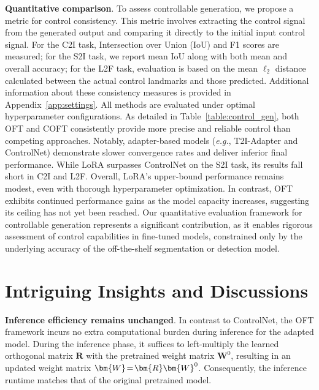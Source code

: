 \textbf{Quantitative comparison}. To assess controllable generation, we propose a metric for control consistency. This metric involves extracting the control signal from the generated output and comparing it directly to the initial input control signal. For the C2I task, Intersection over Union (IoU) and F1 scores are measured; for the S2I task, we report mean IoU along with both mean and overall accuracy; for the L2F task, evaluation is based on the mean $\ell_2$ distance calculated between the actual control landmarks and those predicted. Additional information about these consistency measures is provided in Appendix~\ref{app:settings}. All methods are evaluated under optimal hyperparameter configurations. As detailed in Table~\ref{table:control_gen}, both OFT and COFT consistently provide more precise and reliable control than competing approaches. Notably, adapter-based models (\emph{e.g.}, T2I-Adapter and ControlNet) demonstrate slower convergence rates and deliver inferior final performance. While LoRA surpasses ControlNet on the S2I task, its results fall short in C2I and L2F. Overall, LoRA’s upper-bound performance remains modest, even with thorough hyperparameter optimization. In contrast, OFT exhibits continued performance gains as the model capacity increases, suggesting its ceiling has not yet been reached. Our quantitative evaluation framework for controllable generation represents a significant contribution, as it enables rigorous assessment of control capabilities in fine-tuned models, constrained only by the underlying accuracy of the off-the-shelf segmentation or detection model.

\section{Intriguing Insights and Discussions}

\textbf{Inference efficiency remains unchanged}. In contrast to ControlNet, the OFT framework incurs no extra computational burden during inference for the adapted model. During the inference phase, it suffices to left-multiply the learned orthogonal matrix $\bm{R}$ with the pretrained weight matrix $\bm{W}^0$, resulting in an updated weight matrix $\thickmuskip=2mu \medmuskip=2mu \bm{W} = \bm{R} \bm{W}^0$. Consequently, the inference runtime matches that of the original pretrained model.

